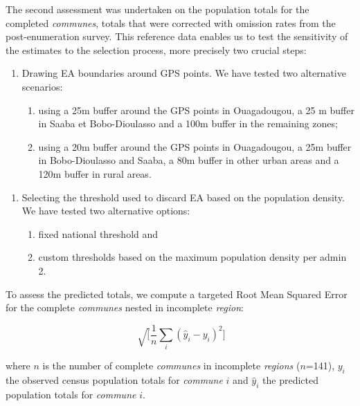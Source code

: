 \documentclass[]{book}
\begin{document}
The second assessment was undertaken on the population totals for the
completed \emph{communes}, totals that were corrected with omission
rates from the post-enumeration survey. This reference data enables us
to test the sensitivity of the estimates to the selection process, more
precisely two crucial steps:

\begin{enumerate}
\def\labelenumi{\arabic{enumi}.}
\item
  Drawing EA boundaries around GPS points. We have tested two
  alternative scenarios:

  \begin{enumerate}
  \def\labelenumii{\arabic{enumii}.}
  \item
    using a 25m buffer around the GPS points in Ouagadougou, a 25 m
    buffer in Saaba et Bobo-Dioulasso and a 100m buffer in the remaining
    zones;
  \item
    using a 20m buffer around the GPS points in Ouagadougou, a 25m
    buffer in Bobo-Dioulasso and Saaba, a 80m buffer in other urban
    areas and a 120m buffer in rural areas.
  \end{enumerate}
\end{enumerate}

\begin{enumerate}
\def\labelenumi{\arabic{enumi}.}
\setcounter{enumi}{1}
\item
  Selecting the threshold used to discard EA based on the population
  density. We have tested two alternative options:

  \begin{enumerate}
  \def\labelenumii{\arabic{enumii}.}
  \item
    fixed national threshold and
  \item
    custom thresholds based on the maximum population density per admin
    2.
  \end{enumerate}
\end{enumerate}

To assess the predicted totals, we compute a targeted Root Mean Squared
Error for the complete \emph{communes} nested in incomplete
\emph{region}:

\[
\sqrt[][\frac{1}{n} \sum_i (\hat{y}_i - y_i)^2]
\]

where \(n\) is the number of complete \emph{communes} in incomplete
\emph{regions} (\(n\)=141), \(y_i\) the observed census population
totals for \emph{commune} \(i\) and \(\hat{y}_i\) the predicted
population totals for \emph{commune} \(i\).
\end{document}
